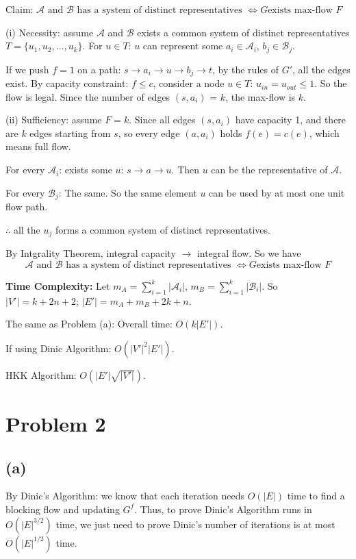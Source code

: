 \documentclass[11pt]{article}
\begin{document}
Claim: $\mathcal{A} \text{ and } \mathcal{B} \text{ has a system of distinct representatives } \iff G \text{exists max-flow }F$

(i) Necessity: assume $\mathcal{A}$ and $\mathcal{B}$ exists a common system of distinct representatives $T = \{u_1, u_2, \dots, u_k\}$.
For $u \in T$: $u$ can represent some $a_i \in \mathcal{A}_i$, $b_j \in \mathcal{B}_j$. 

If we push $f = 1$ on a path: $s \to a_i \to u \to b_j \to t$, by the rules of $G'$, all the edges exist. 
By capacity constraint: $f \le c$, consider a node $u \in T$: $u_{in} = u_{out} \le 1$. So the flow is legal. 
Since the number of edges $(s, a_i)$ = $k$, the max-flow is $k$. 

(ii) Sufficiency: assume $F = k$. Since all edges $(s, a_i)$ have capacity 1, 
and there are $k$ edges starting from $s$, so every edge $(a, a_i)$ holds $f(e) = c(e)$, which means full flow. 

For every $\mathcal{A}_i$: exists some $u$: $s \to a \to u$. Then $u$ can be the representative of $\mathcal{A}$. 

For every $\mathcal{B}_j$: The same. So the same element $u$ can be used by at most one unit flow path.

$\therefore$ all the $u_j$ forms a common system of distinct representatives. 

By Intgrality Theorem, integral capacity $\to$ integral flow. So we have 
\[\mathcal{A} \text{ and } \mathcal{B} \text{ has a system of distinct representatives } \iff G \text{exists max-flow }F\]

\textbf{Time Complexity: }
Let $m_A = \sum_{i=1}^{k} |\mathcal{A}_i|$, $m_B = \sum_{i=1}^{k} |\mathcal{B}_i|$. So $|V'| = k + 2n + 2$; $|E'| = m_A + m_B + 2k + n$. 

The same as Problem (a): Overall time: $O(k|E'|)$. 

If using Dinic Algorithm: $O(|V'|^2 |E'|)$.

HKK Algorithm: $O(|E'|\sqrt{|V'|})$. 

\newpage

\section*{Problem 2}
\subsection*{(a)}
By Dinic's Algorithm: we know that each iteration needs $O(|E|)$ time to find a blocking flow and updating $G^f$. 
Thus, to prove Dinic's Algorithm runs in $O(|E|^{3/2})$ time, we just need to prove Dinic's number of iterations is at most $O(|E|^{1/2})$ time. 
\end{document}
